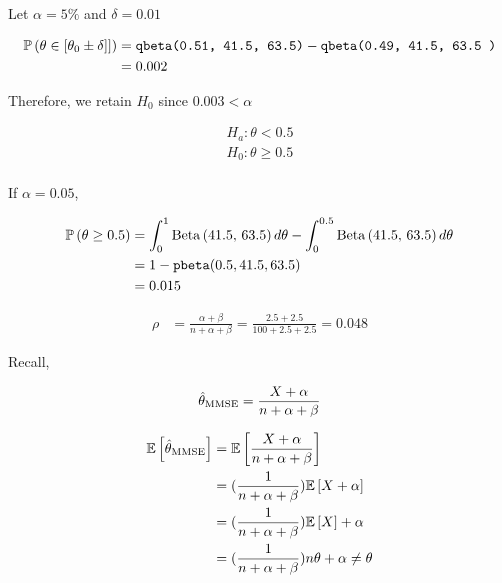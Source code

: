 \documentclass[12pt]{article}
\begin{document}
\begin{enumerate}
Let $\alpha = 5\%$ and $\delta = 0.01$

\begin{align*}
    \mathbb{P}\left(\theta \in [\theta_0 \pm \delta]]\right) &= \texttt{qbeta(0.51, 41.5, 63.5)} - \texttt{qbeta(0.49, 41.5, 63.5 )} \\
    &= 0.002
\end{align*}

Therefore, we retain $H_0$ since $0.003 < \alpha$


\begin{align*}
   H_a : \theta < 0.5 \\
   H_0 : \theta \geq 0.5 \\ 
\end{align*}

If $\alpha = 0.05$,

\begin{align*}
    \mathbb{P}\left(\theta \geq 0.5\right) &= \int_0^1 \mathrm{Beta}\left(41.5,\,63.5\right)d\theta - \int_0^{0.5} \mathrm{Beta}\left(41.5,\,63.5\right)d\theta \\
    &= 1 - \texttt{pbeta}(0.5, 41.5, 63.5) \\ 
    &= 0.015
\end{align*}


\begin{align*}
    \rho &= \frac{\alpha+\beta}{n+\alpha+\beta} = \frac{2.5 + 2.5}{100 + 2.5 + 2.5} = 0.048
\end{align*}


Recall,

\begin{align*}
    \hat{\theta}_{\mathrm{MMSE}} = \frac{X + \alpha}{n + \alpha + \beta} 
\end{align*}

\begin{align*}
    \mathbb{E}\left[\hat{\theta}_{\mathrm{MMSE}}\right] &= \mathbb{E}\left[\frac{X + \alpha}{n + \alpha + \beta}\right] \\
        &= (\frac{1}{n+\alpha+\beta})\mathbb{E}\left[X + \alpha\right] \\
        &= (\frac{1}{n+\alpha+\beta})\mathbb{E}\left[X\right] + \alpha \\
        &= (\frac{1}{n+\alpha+\beta})n\theta + \alpha \neq \theta
\end{align*} 


\end{enumerate}
\end{document}
